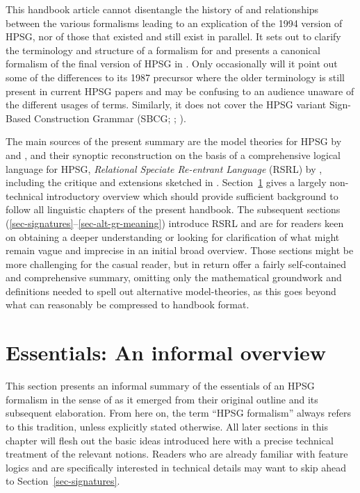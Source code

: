 \documentclass[output=paper
 	        ,biblatex
                ,babelshorthands
                ,newtxmath
                ,draftmode
                ,colorlinks, citecolor=brown
]{langscibook}
\begin{document}
This handbook article cannot disentangle the history of and relationships
between the various formalisms leading to an explication of the
1994 version of HPSG, nor of those that existed and still exist in
parallel. It sets out to clarify the terminology and
structure of a formalism for  and
presents a canonical formalism of the final version of
HPSG in . Only occasionally will it point out some of
the differences to its 1987 precursor where
the older terminology is still present in current HPSG papers and
may be confusing to an audience unaware of the different
usages of terms. Similarly, it does not cover the HPSG variant Sign-Based
Construction Grammar (SBCG; \citealt{Sag2012a}; ).


The main sources of the present summary are the
model theories for HPSG by \citet{King99a-u} and \citet{Pollard99a}, and
their synoptic reconstruction on the basis of a comprehensive logical
language for HPSG, \emph{Relational Speciate Re-entrant Language}
(RSRL) by \citet{Richter2004a-u}, including the critique and
extensions sketched in
\citet{Richter2007a}. Section~\ref{sec-essentials} gives a largely
non-technical introductory overview which should provide sufficient
background to follow all linguistic chapters of the present
handbook. The subsequent sections
(\ref{sec-signatures}--\ref{sec-alt-gr-meaning}) introduce RSRL and are for readers
keen on obtaining a deeper understanding or looking for clarification
of what might
remain vague and imprecise in an initial broad overview. Those sections
might be more challenging for the casual reader, but in return offer a
fairly self-contained and comprehensive summary, omitting only
the mathematical groundwork and
definitions needed to spell out alternative
model-theories, as this goes beyond what can reasonably be compressed to
handbook format.


\section{Essentials: An informal overview}
\label{sec-essentials}\label{formal:sec-essentials}


This section presents an informal summary of the essentials of an HPSG
formalism in the sense of  as it emerged from their
original outline and its subsequent elaboration. From here on, the term
``HPSG formalism'' always refers to this tradition, unless explicitly
stated otherwise.  All later sections in this chapter will flesh out
the basic ideas introduced here with a precise technical treatment of
the relevant notions. Readers who are already familiar with feature
logics and are specifically interested in technical details may want
to skip ahead to Section~\ref{sec-signatures}.
\end{document}
